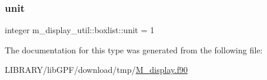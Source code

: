 \mbox{\label{structm__display__util_1_1boxlist_a25d8047955ec4e12f09ff9233ba5c666}} 
\subsubsection{\texorpdfstring{unit}{unit}}
{\footnotesize\ttfamily integer m\+\_\+display\+\_\+util\+::boxlist\+::unit = 1\hspace{0.3cm}{\ttfamily [private]}}



The documentation for this type was generated from the following file\+:\begin{DoxyCompactItemize}
\item 
L\+I\+B\+R\+A\+R\+Y/lib\+G\+P\+F/download/tmp/\hyperlink{M__display_8f90}{M\+\_\+display.\+f90}\end{DoxyCompactItemize}
